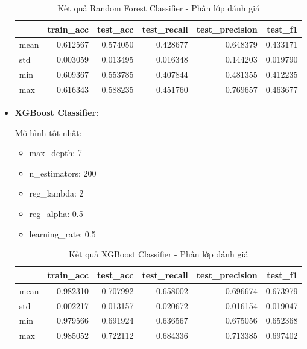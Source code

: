 \begin{itemize}
            \begin{table}[htbp]
                \centering
                \caption{Kết quả Random Forest Classifier - Phân lớp đánh giá}
                \label{tab:mal-score-RF}
                \begin{tabular}{lrrrrr}
                    \hline
                     & train\_acc & test\_acc & test\_recall & test\_precision & test\_f1 \\
                    \hline
                    mean & 0.612567 & 0.574050 & 0.428677 & 0.648379 & 0.433171 \\
                    std & 0.003059 & 0.013495 & 0.016348 & 0.144203 & 0.019790 \\
                    min & 0.609367 & 0.553785 & 0.407844 & 0.481355 & 0.412235 \\
                    max & 0.616343 & 0.588235 & 0.451760 & 0.769657 & 0.463677 \\
                    \hline
                \end{tabular}
            \end{table}
            
            \FloatBarrier

        \item \textbf{XGBoost Classifier}:
        
            Mô hình tốt nhất:
            \begin{itemize}
                \item max\_depth: 7
                \item n\_estimators: 200
                \item reg\_lambda: 2
                \item reg\_alpha: 0.5
                \item learning\_rate: 0.5
            \end{itemize}

            \begin{table}[htbp]
                \centering
                \caption{Kết quả XGBoost Classifier - Phân lớp đánh giá}
                \label{tab:mal-score-XGBC}
                \begin{tabular}{lrrrrr}
                \hline
                 & train\_acc & test\_acc & test\_recall & test\_precision & test\_f1  \\
                \hline
                mean & 0.982310 & 0.707992 & 0.658002 & 0.696674 & 0.673979 \\
                std & 0.002217 & 0.013157 & 0.020672 & 0.016154 & 0.019047 \\
                min & 0.979566 & 0.691924 & 0.636567 & 0.675056 & 0.652368 \\
                max & 0.985052 & 0.722112 & 0.684336 & 0.713385 & 0.697402 \\
                \hline
                \end{tabular}
            \end{table}

            \FloatBarrier
    \end{itemize}


